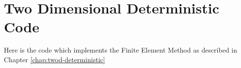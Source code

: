 \chapter{Two Dimensional Deterministic Code}\label{app:twod-deterministic-code}

Here is the code which implements the Finite Element Method as described in
Chapter \ref{chap:twod-deterministic}



